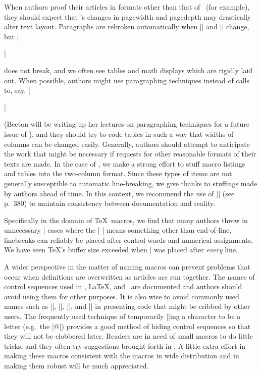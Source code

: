 When authors proof their articles in formats other than that of \TUB\
(for example), they should expect that \TUB's changes in pagewidth and
pagedepth may drastically alter text layout.  Paragraphs are rebroken
automatically when |\hsize| and |\vsize| change, but |\centerline|
does not break, and we often see tables and math displays which are
rigidly laid out.  When possible, authors might use paragraphing
techniques instead of calls to, say, |\centerline| (Beeton will be
writing up her lectures on paragraphing techniques for a future issue
of \TUB\/), and they should try to code tables in such a way that
widths of columns can be changed easily.  Generally, authors should
attempt to anticipate the work that might be necessary if requests for
other reasonable formats of their texts are made.  In the case of
\TUB, we make a strong effort to stuff macro listings and tables into
the two-column format.  Since these types of items are not generally
susceptible to automatic line-breaking, we give thanks to stuffings
made by authors ahead of time.  In this context, we recommend the use
of |\verbfile{...}| (see p.~380) to maintain consistency between
documentation and reality.

Specifically in the domain of \TeX\ macros, we find that many authors
throw in unnecessary |%
cases where the |^^M| means something other than end-of-line,
linebreaks can reliably be placed after control-words and numerical
assignments.  We have seen \TeX's buffer size exceeded when |%
was placed after {\it every\/} line.

A wider perspective in the matter of naming macros can prevent
problems that occur when definitions are overwritten as articles are
run together.  The names of control sequences used in \plain, \LaTeX,
and \AmSTeX\ are documented and authors should avoid using them for
other purposes.  It is also wise to avoid commonly used names such as
|\temp|, |\result|, |\1|, and |\mac| in presenting code that might be
cribbed by other users.  The frequently used technique of temporarily
|\catcode|ing a character to be a letter (e.g.\ the |@|) provides a
good method of hiding control sequences so that they will not be
clobbered later.  Readers are in need of small macros to do little
tricks, and they often try suggestions brought forth in \TUB.  A
little extra effort in making these macros consistent with the macros
in wide distribution and in making them robust will be much
appreciated.



